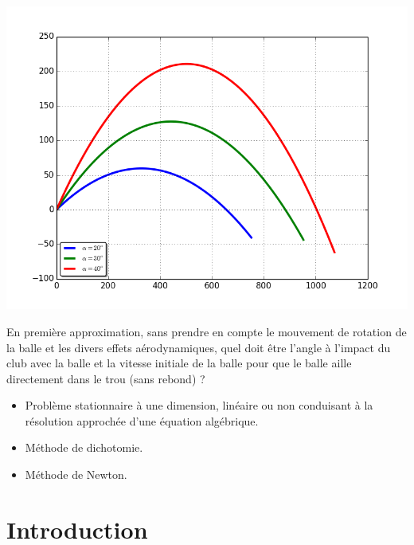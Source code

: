 \documentclass[10pt]{article}
\begin{document}
\begin{minipage}[c]{.45\linewidth}
\begin{center}
\includegraphics[width=.95\textwidth]{images/tir_alpha}
\end{center}
\end{minipage}
\vspace{.5cm}

En première approximation, sans prendre en compte le mouvement de rotation de la balle et les divers effets aérodynamiques, quel doit être l'angle à l'impact du club avec la balle et la vitesse initiale de la balle pour que le balle aille directement dans le trou (sans rebond) ?

\begin{savoir}
\begin{itemize}
\item Problème stationnaire à une dimension, linéaire ou non conduisant à la résolution
approchée d’une équation algébrique.%
\item Méthode de dichotomie.
\item Méthode de Newton.
\end{itemize}
\end{savoir}



\setlength{\parskip}{0ex plus 0.2ex minus 0ex}
 \renewcommand{\contentsname}{}
 \renewcommand{\baselinestretch}{1}

\tableofcontents

 \renewcommand{\baselinestretch}{1.2}
\setlength{\parskip}{2ex plus 0.5ex minus 0.2ex}


\section{Introduction}
\end{document}
